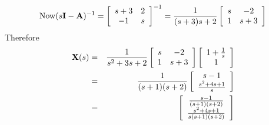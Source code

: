 \[
{\rm{Now }}(s{\bf{I}} - {\bf{A}})^{ - 1}  = \left[ {\begin{array}{*{20}c}
   {s + 3} & 2  \\
   { - 1} & s  \\
\end{array}} \right]^{ - 1}  = \frac{1}{{(s + 3)s + 2}}\left[ {\begin{array}{*{20}c}
   s & { - 2}  \\
   1 & {s + 3}  \\
\end{array}} \right]
\]
Therefore
\begin{eqnarray*}
	{\bf{X}}(s) & = & \frac{1}{{s^2  + 3s + 2}}\left[ {\begin{array}{*{20}c}
	   s & { - 2}  \\
	   1 & {s + 3}  \\
	\end{array}} \right]\left[ {\begin{array}{*{20}c}
	   {1 + \frac{1}{s}}  \\
	   1  \\
	\end{array}} \right] \\
	            & = & \frac{1}{{(s + 1)(s + 2)}}\left[ {\begin{array}{*{20}c}
	   {s - 1}  \\
	   {\frac{{s^2  + 4s + 1}}{s}}  \\
	\end{array}} \right] \\
	&  = & \left[ {\begin{array}{*{20}c}
	   {\frac{{s - 1}}{{(s + 1)(s + 2)}}}  \\
	   {\frac{{s^2  + 4s + 1}}{{s(s + 1)(s + 2)}}}  \\
	\end{array}} \right]
\end{eqnarray*}

